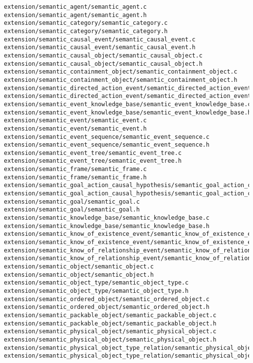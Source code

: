 \begin{lstlisting}
extension/semantic_agent/semantic_agent.c
extension/semantic_agent/semantic_agent.h
extension/semantic_category/semantic_category.c
extension/semantic_category/semantic_category.h
extension/semantic_causal_event/semantic_causal_event.c
extension/semantic_causal_event/semantic_causal_event.h
extension/semantic_causal_object/semantic_causal_object.c
extension/semantic_causal_object/semantic_causal_object.h
extension/semantic_containment_object/semantic_containment_object.c
extension/semantic_containment_object/semantic_containment_object.h
extension/semantic_directed_action_event/semantic_directed_action_event.c
extension/semantic_directed_action_event/semantic_directed_action_event.h
extension/semantic_event_knowledge_base/semantic_event_knowledge_base.c
extension/semantic_event_knowledge_base/semantic_event_knowledge_base.h
extension/semantic_event/semantic_event.c
extension/semantic_event/semantic_event.h
extension/semantic_event_sequence/semantic_event_sequence.c
extension/semantic_event_sequence/semantic_event_sequence.h
extension/semantic_event_tree/semantic_event_tree.c
extension/semantic_event_tree/semantic_event_tree.h
extension/semantic_frame/semantic_frame.c
extension/semantic_frame/semantic_frame.h
extension/semantic_goal_action_causal_hypothesis/semantic_goal_action_causal_hypothesis.c
extension/semantic_goal_action_causal_hypothesis/semantic_goal_action_causal_hypothesis.h
extension/semantic_goal/semantic_goal.c
extension/semantic_goal/semantic_goal.h
extension/semantic_knowledge_base/semantic_knowledge_base.c
extension/semantic_knowledge_base/semantic_knowledge_base.h
extension/semantic_know_of_existence_event/semantic_know_of_existence_event.c
extension/semantic_know_of_existence_event/semantic_know_of_existence_event.h
extension/semantic_know_of_relationship_event/semantic_know_of_relationship_event.c
extension/semantic_know_of_relationship_event/semantic_know_of_relationship_event.h
extension/semantic_object/semantic_object.c
extension/semantic_object/semantic_object.h
extension/semantic_object_type/semantic_object_type.c
extension/semantic_object_type/semantic_object_type.h
extension/semantic_ordered_object/semantic_ordered_object.c
extension/semantic_ordered_object/semantic_ordered_object.h
extension/semantic_packable_object/semantic_packable_object.c
extension/semantic_packable_object/semantic_packable_object.h
extension/semantic_physical_object/semantic_physical_object.c
extension/semantic_physical_object/semantic_physical_object.h
extension/semantic_physical_object_type_relation/semantic_physical_object_type_relation.c
extension/semantic_physical_object_type_relation/semantic_physical_object_type_relation.h

\end{lstlisting}
